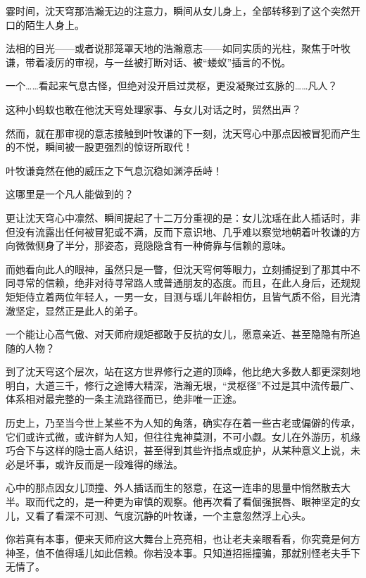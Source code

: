 霎时间，沈天穹那浩瀚无边的注意力，瞬间从女儿身上，全部转移到了这个突然开口的陌生人身上。

法相的目光——或者说那笼罩天地的浩瀚意志——如同实质的光柱，聚焦于叶牧谦，带着凌厉的审视，与一丝被打断对话、被“蝼蚁”插言的不悦。

一个……看起来气息古怪，但绝对没开启过灵枢，更没凝聚过玄脉的……凡人？

这种小蚂蚁也敢在他沈天穹处理家事、与女儿对话之时，贸然出声？

\vspace{2em}

然而，就在那审视的意志接触到叶牧谦的下一刻，沈天穹心中那点因被冒犯而产生的不悦，瞬间被一股更强烈的惊讶所取代！

叶牧谦竟然在他的威压之下气息沉稳如渊渟岳峙！

这哪里是一个凡人能做到的？

更让沈天穹心中凛然、瞬间提起了十二万分重视的是：女儿沈瑶在此人插话时，非但没有流露出任何被冒犯或不满，反而下意识地、几乎难以察觉地朝着叶牧谦的方向微微侧身了半分，那姿态，竟隐隐含有一种倚靠与信赖的意味。

而她看向此人的眼神，虽然只是一瞥，但沈天穹何等眼力，立刻捕捉到了那其中不同寻常的信赖，绝非对待寻常路人或普通朋友的态度。而且，在此人身后，还规规矩矩侍立着两位年轻人，一男一女，目测与瑶儿年龄相仿，且皆气质不俗，目光清澈坚定，显然正是此人的弟子。

一个能让心高气傲、对天师府规矩都敢于反抗的女儿，愿意亲近、甚至隐隐有所追随的人物？

\vspace{2em}

到了沈天穹这个层次，站在这方世界修行之道的顶峰，他比绝大多数人都更深刻地明白，大道三千，修行之途博大精深，浩瀚无垠，“灵枢径”不过是其中流传最广、体系相对最完整的一条主流路径而已，绝非唯一正途。

历史上，乃至当今世上某些不为人知的角落，确实存在着一些古老或偏僻的传承，它们或许式微，或许鲜为人知，但往往鬼神莫测，不可小觑。女儿在外游历，机缘巧合下与这样的隐士高人结识，甚至得到其些许指点或庇护，从某种意义上说，未必是坏事，或许反而是一段难得的缘法。

心中的那点因女儿顶撞、外人插话而生的怒意，在这一连串的思量中悄然散去大半。取而代之的，是一种更为审慎的观察。他再次看了看倔强抿唇、眼神坚定的女儿，又看了看深不可测、气度沉静的叶牧谦，一个主意忽然浮上心头。

你若真有本事，便来天师府这大舞台上亮亮相，也让老夫亲眼看看，你究竟是何方神圣，值不值得瑶儿如此信赖。你若没本事。只知道招摇撞骗，那就别怪老夫手下无情了。

